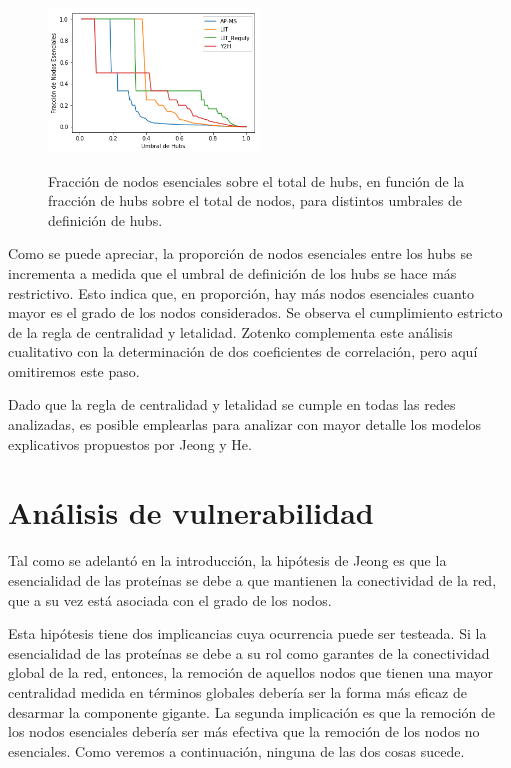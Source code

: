 \documentclass[%
 reprint,
 amsmath,amssymb,
 aps,
]{revtex4-1}
\begin{document}
\begin{figure}
\includegraphics[width=0.5\textwidth]{figura1.png}
\label{figura1}
\caption{Fracci\'on de nodos esenciales sobre el total de hubs, en funci\'on de la fracci\'on de hubs sobre el total de nodos, para distintos umbrales de definici\'on de hubs.}
\end{figure}

Como se puede apreciar, la proporci\'on de nodos esenciales entre los hubs se incrementa a medida que el umbral de definici\'on de los hubs se hace m\'as restrictivo. Esto indica que, en proporci\'on, hay m\'as nodos esenciales cuanto mayor es el grado de los nodos considerados. Se observa el cumplimiento estricto de la regla de centralidad y letalidad. Zotenko complementa este an\'alisis cualitativo con la determinaci\'on de dos coeficientes de correlaci\'on, pero aqu\'i omitiremos este paso.

Dado que la regla de centralidad y letalidad se cumple en todas las redes analizadas, es posible emplearlas para analizar con mayor detalle los modelos explicativos propuestos por Jeong y He.

\section{An\'alisis de vulnerabilidad}

Tal como se adelant\'o en la introducci\'on, la hip\'otesis de Jeong es que la esencialidad de las prote\'inas se debe a que mantienen la conectividad de la red, que a su vez est\'a asociada con el grado de los nodos.

Esta hip\'otesis tiene dos implicancias cuya ocurrencia puede ser testeada. Si la esencialidad de las prote\'inas se debe a su rol como garantes de la conectividad global de la red, entonces, la remoci\'on de aquellos nodos que tienen una mayor centralidad medida en t\'erminos globales deber\'ia ser la forma m\'as eficaz de desarmar la componente gigante. La segunda implicaci\'on es que la remoci\'on de los nodos esenciales deber\'ia ser m\'as efectiva que la remoci\'on de los nodos no esenciales. Como veremos a continuaci\'on, ninguna de las dos cosas sucede. 
\end{document}
